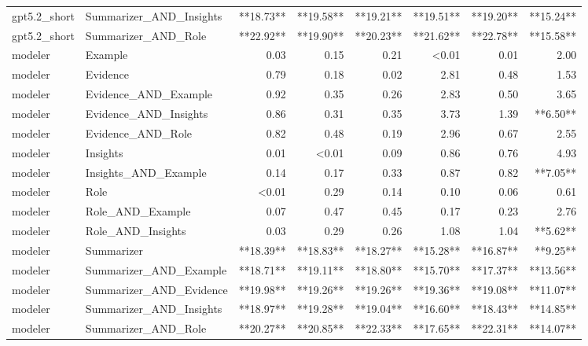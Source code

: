 \begin{tabular}{llrrrrrr}
gpt5.2_short & Summarizer_AND_Insights & **18.73** & **19.58** & **19.21** & **19.51** & **19.20** & **15.24** \\
gpt5.2_short & Summarizer_AND_Role & **22.92** & **19.90** & **20.23** & **21.62** & **22.78** & **15.58** \\
modeler & Example & 0.03 & 0.15 & 0.21 & <0.01 & 0.01 & 2.00 \\
modeler & Evidence & 0.79 & 0.18 & 0.02 & 2.81 & 0.48 & 1.53 \\
modeler & Evidence_AND_Example & 0.92 & 0.35 & 0.26 & 2.83 & 0.50 & 3.65 \\
modeler & Evidence_AND_Insights & 0.86 & 0.31 & 0.35 & 3.73 & 1.39 & **6.50** \\
modeler & Evidence_AND_Role & 0.82 & 0.48 & 0.19 & 2.96 & 0.67 & 2.55 \\
modeler & Insights & 0.01 & <0.01 & 0.09 & 0.86 & 0.76 & 4.93 \\
modeler & Insights_AND_Example & 0.14 & 0.17 & 0.33 & 0.87 & 0.82 & **7.05** \\
modeler & Role & <0.01 & 0.29 & 0.14 & 0.10 & 0.06 & 0.61 \\
modeler & Role_AND_Example & 0.07 & 0.47 & 0.45 & 0.17 & 0.23 & 2.76 \\
modeler & Role_AND_Insights & 0.03 & 0.29 & 0.26 & 1.08 & 1.04 & **5.62** \\
modeler & Summarizer & **18.39** & **18.83** & **18.27** & **15.28** & **16.87** & **9.25** \\
modeler & Summarizer_AND_Example & **18.71** & **19.11** & **18.80** & **15.70** & **17.37** & **13.56** \\
modeler & Summarizer_AND_Evidence & **19.98** & **19.26** & **19.26** & **19.36** & **19.08** & **11.07** \\
modeler & Summarizer_AND_Insights & **18.97** & **19.28** & **19.04** & **16.60** & **18.43** & **14.85** \\
modeler & Summarizer_AND_Role & **20.27** & **20.85** & **22.33** & **17.65** & **22.31** & **14.07** \\
\bottomrule
\end{tabular}
